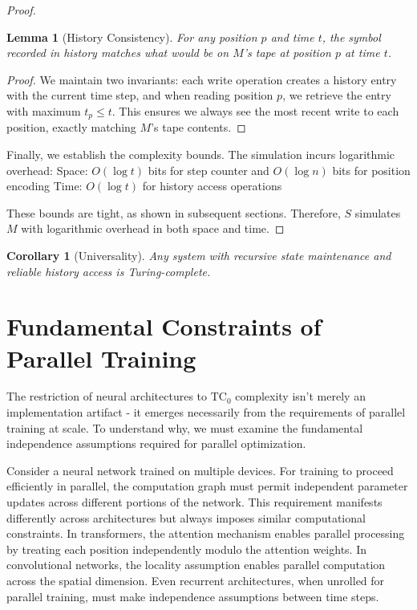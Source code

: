 \documentclass[12pt]{article}
\newtheorem{lemma}[theorem]{Lemma}
\newtheorem{corollary}[theorem]{Corollary}
\begin{document}
\begin{proof}
\begin{lemma}[History Consistency]
For any position $p$ and time $t$, the symbol recorded in history matches what would be on $M$'s tape at position $p$ at time $t$.
\end{lemma}

\begin{proof}
We maintain two invariants: each write operation creates a history entry with the current time step, and when reading position $p$, we retrieve the entry with maximum $t_p \leq t$. This ensures we always see the most recent write to each position, exactly matching $M$'s tape contents.
\end{proof}

Finally, we establish the complexity bounds. The simulation incurs logarithmic overhead:
Space: $O(\log t)$ bits for step counter and $O(\log n)$ bits for position encoding
Time: $O(\log t)$ for history access operations

These bounds are tight, as shown in subsequent sections. Therefore, $S$ simulates $M$ with logarithmic overhead in both space and time.
\end{proof}

\begin{corollary}[Universality]
Any system with recursive state maintenance and reliable history access is Turing-complete.
\end{corollary}

\section{Fundamental Constraints of Parallel Training}

The restriction of neural architectures to $\text{TC}_0$ complexity isn't merely an implementation artifact - it emerges necessarily from the requirements of parallel training at scale. To understand why, we must examine the fundamental independence assumptions required for parallel optimization.

Consider a neural network trained on multiple devices. For training to proceed efficiently in parallel, the computation graph must permit independent parameter updates across different portions of the network. This requirement manifests differently across architectures but always imposes similar computational constraints. In transformers, the attention mechanism enables parallel processing by treating each position independently modulo the attention weights. In convolutional networks, the locality assumption enables parallel computation across the spatial dimension. Even recurrent architectures, when unrolled for parallel training, must make independence assumptions between time steps.
\end{document}
